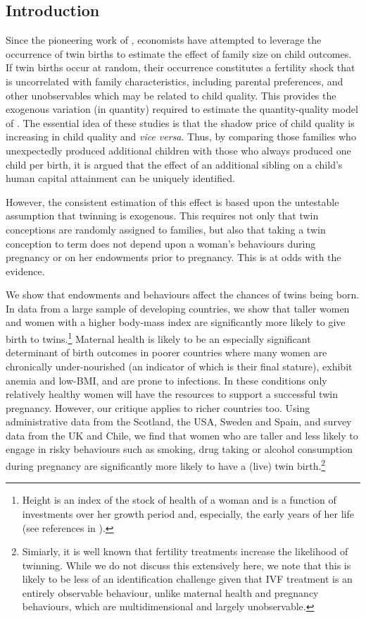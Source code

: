 \documentclass[subeqn]{article}
\begin{document}
\begin{spacing}{1.4}
\section{Introduction}                             \label{TWINscn:intro}
Since the pioneering work of \citet{RosenzweigWolpin1980}, economists have 
attempted to leverage the occurrence of twin births to estimate the effect of 
family size on child outcomes. If twin births occur at random, their occurrence 
constitutes a fertility shock that is uncorrelated with family characteristics, 
including parental preferences, and other unobservables which may be related to 
child quality. This provides the exogenous variation (in quantity) required to 
estimate the quantity-quality model of \citet{Becker1960,BeckerLewis1973,
BeckerTomes1976}.  The essential idea of these studies is that the shadow price 
of child quality is increasing in child quality and \emph{vice versa}. Thus, by 
comparing those families who unexpectedly produced additional children with 
those who always produced one child per birth, it is argued that the effect of 
an additional sibling on a child's human capital attainment can be uniquely
identified.

However, the consistent estimation of this effect is based upon the untestable 
assumption that twinning is exogenous. This requires not only that twin 
conceptions are randomly assigned to families, but also that taking a twin
conception to term does not depend upon a woman's behaviours during pregnancy 
or on her endowments prior to pregnancy. This is at odds with the evidence.

We show that endowments and behaviours affect the chances of twins being born. 
In data from a large sample of developing countries, we show that taller women 
and women with a higher body-mass index are significantly more likely to give 
birth to twins.\footnote{Height is an index of the stock of health of a woman 
and is a function of investments over her growth period and, especially, the 
early years of her life (see references in \citet{BhalotraRawlings2013}).} 
Maternal health is likely to be an especially significant determinant of birth 
outcomes in poorer countries where many women are chronically under-nourished 
(an indicator of which is their final stature), exhibit anemia and low-BMI, and 
are prone to infections. In these conditions only relatively healthy women will 
have the resources to support a successful twin pregnancy. However, our critique 
applies to richer countries too. Using administrative data from the Scotland,
the USA, Sweden and Spain, and survey data from the UK and Chile, we find that 
women who are taller and less likely to engage in risky behaviours such as 
smoking, drug taking or alcohol consumption during pregnancy are significantly 
more likely to have a (live) twin birth.\footnote{Simiarly, it is well known 
that fertility treatments increase the likelihood of twinning. While we do not 
discuss this extensively here, we note that this is likely to be less of an 
identification challenge given that IVF treatment is an entirely observable 
behaviour, unlike maternal health and pregnancy behaviours, which are 
multidimensional and largely unobservable.}


\end{spacing}
\end{document}
